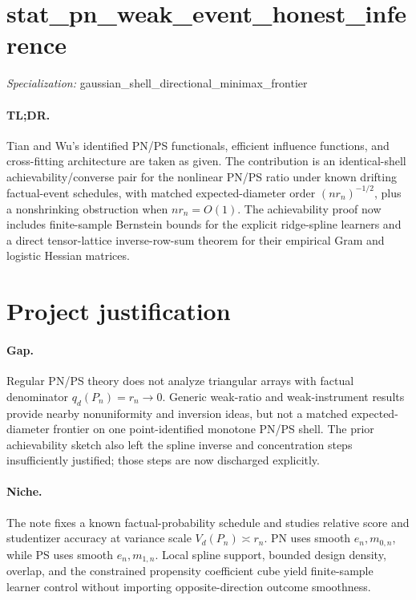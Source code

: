 \documentclass{article}
\begin{document}
\sloppy

\section*{stat\_\allowbreak{}pn\_\allowbreak{}weak\_\allowbreak{}event\_\allowbreak{}honest\_\allowbreak{}inference}

\noindent\textit{Specialization:} gaussian\_\allowbreak{}shell\_\allowbreak{}directional\_\allowbreak{}minimax\_\allowbreak{}frontier\par

\paragraph{TL;DR.} Tian and Wu's identified PN/PS functionals, efficient influence functions, and cross-fitting architecture are taken as given. The contribution is an identical-shell achievability/converse pair for the nonlinear PN/PS ratio under known drifting factual-event schedules, with matched expected-diameter order \((nr_n)^{-1/2}\), plus a nonshrinking obstruction when \(nr_n=O(1)\). The achievability proof now includes finite-sample Bernstein bounds for the explicit ridge-spline learners and a direct tensor-lattice inverse-row-sum theorem for their empirical Gram and logistic Hessian matrices.

\section{Project justification}

\paragraph{Gap.} Regular PN/PS theory does not analyze triangular arrays with factual denominator \(q_d(P_n)=r_n\to0\). Generic weak-ratio and weak-instrument results provide nearby nonuniformity and inversion ideas, but not a matched expected-diameter frontier on one point-identified monotone PN/PS shell. The prior achievability sketch also left the spline inverse and concentration steps insufficiently justified; those steps are now discharged explicitly.

\paragraph{Niche.} The note fixes a known factual-probability schedule and studies relative score and studentizer accuracy at variance scale \(V_d(P_n)\asymp r_n\). PN uses smooth \(e_n,m_{0,n}\), while PS uses smooth \(e_n,m_{1,n}\). Local spline support, bounded design density, overlap, and the constrained propensity coefficient cube yield finite-sample learner control without importing opposite-direction outcome smoothness.
\end{document}
